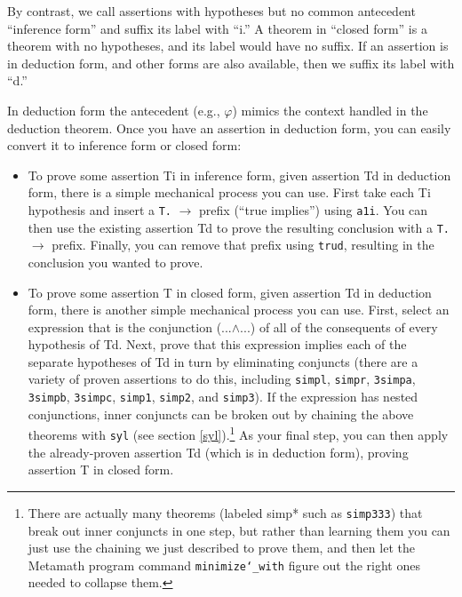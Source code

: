 By contrast, we call assertions with hypotheses
but no common antecedent ``inference form''%
and suffix its label with ``i.''
A theorem in ``closed form''%
is a theorem with no hypotheses,
and its label would have no suffix.
If an assertion is in deduction form, and other forms are also available,
then we suffix its label with ``d.''

In deduction form the antecedent (e.g., $\varphi$) mimics the context handled
in the deduction theorem.
Once you have an assertion in deduction form, you can easily convert it
to inference form or closed form:

\begin{itemize}
\item To
prove some assertion Ti in inference form, given assertion Td in deduction
form, there is a simple mechanical process you can use. First take each
Ti hypothesis and insert a \texttt{T.} $\rightarrow$ prefix (``true implies'')
using \texttt{a1i}. You
can then use the existing assertion Td to prove the resulting conclusion
with a \texttt{T.} $\rightarrow$ prefix.
Finally, you can remove that prefix using \texttt{trud},
resulting in the conclusion you wanted to prove.
\item To
prove some assertion T in closed form, given assertion Td in deduction
form, there is another simple mechanical process you can use. First,
select an expression that is the conjunction (...$\land$...) of all of the
consequents of every hypothesis of Td. Next, prove that this expression
implies each of the separate hypotheses of Td in turn by eliminating
conjuncts (there are a variety of proven assertions to do this, including
\texttt{simpl},
\texttt{simpr},
\texttt{3simpa},
\texttt{3simpb},
\texttt{3simpc},
\texttt{simp1},
\texttt{simp2},
and
\texttt{simp3}).
If the
expression has nested conjunctions, inner conjuncts can be broken out by
chaining the above theorems with \texttt{syl}
(see section \ref{syl}).\footnote{
There are actually many theorems
(labeled simp* such as \texttt{simp333}) that break out inner conjuncts in one
step, but rather than learning them you can just use the chaining we
just described to prove them, and then let the Metamath program command
\texttt{minimize{\char`\_}with}
figure out the right ones needed to collapse them.}
As your final step, you can then apply the already-proven assertion Td
(which is in deduction form), proving assertion T in closed form.
\end{itemize}

